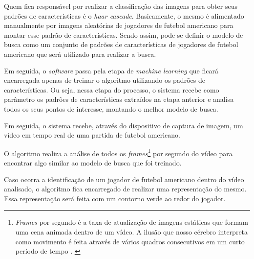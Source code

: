 Quem fica responsável por realizar a classificação das imagens para obter seus padrões de características é o \textit{haar cascade}. Basicamente, o mesmo é alimentado manualmente por imagens aleatórias de jogadores de futebol americano para montar esse padrão de características. Sendo assim, pode-se definir o modelo de busca como um conjunto de padrões de características de jogadores de futebol americano que será utilizado para realizar a busca.

Em seguida, o \textit{software} passa pela etapa de \textit{machine learning} que ficará encarregada apenas de treinar o algoritmo utilizando os padrões de características. Ou seja, nessa etapa do processo, o sistema recebe como parâmetro os padrões de características extraídos na etapa anterior e analisa todos os seus pontos de interesse, montando o melhor modelo de busca.

Em seguida, o sistema recebe, através do dispositivo de captura de imagem, um vídeo em tempo real de uma partida de futebol americano.

O algoritmo realiza a análise de todos os \textit{frames}\footnote{\textit{Frames} por segundo é a taxa de atualização de imagens estáticas que formam uma cena animada dentro de um vídeo. A ilusão que nosso cérebro interpreta como movimento é feita através de vários quadros consecutivos em um curto período de tempo \cite{FRAMES2011}. \label{frames-por-segundo}} por segundo do vídeo para encontrar algo similar ao modelo de busca que foi treinado.

Caso ocorra a identificação de um jogador de futebol americano dentro do vídeo analisado, o algoritmo fica encarregado de realizar uma representação do mesmo. Essa representação será feita com um contorno verde ao redor do jogador.